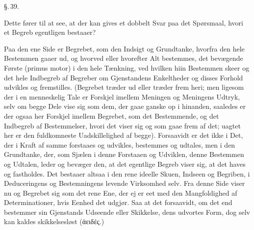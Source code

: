 \documentclass[12pt]{book}
\def\sperr#1{#1}%
\def\textit#1{#1}%
\def\emph#1{#1}%
\newcommand{\sperr}[1]{\textls[180]{#1}}
\newcommand{\parag}[1]{%
  \par\vspace{0.9\baselineskip}%
  {\centering\textit{\S.\,#1.}\par}%
  \vspace{0.35\baselineskip}%
  \noindent\hspace{\parindent}\ignorespaces
}
\newcommand{\opage}[1]{\marginnote{\footnotesize\textit{[#1]}}}
\begin{document}
\parag{39}

Dette fører til at see, at der kan gives et dobbelt Svar paa det Spørsmaal,
\emph{hvori et Begreb egentligen \sperr{bestaaer}?}

Paa den ene Side er Begrebet, som den Indsigt og Grundtanke, hvorfra den hele
Bestemmen gaaer ud, og hvorved eller hvorefter Alt bestemmes, det bevægende
Første (\textit{primus motor}) i den hele Tænkning, ved hvilken hiin Bestemmen
skeer og det hele Indbegreb af Begreber om Gjenstandens Enkeltheder og disses
Forhold udvikles og fremstilles. (Begrebet træder ud eller træder frem heri; men
ligesom der i en menneskelig Tale er Forskjel imellem Meningen og Meningens
Udtryk, selv om begge Dele vise sig som dem, der gaae ganske op i hinanden,
saaledes er der ogsaa her Forskjel imellem Begrebet, som det Bestemmende, og det
Indbegreb af Bestemmelser, hvori det viser sig og som gaae frem af det; uagtet
her er den fuldkomneste Uadskillelighed af begge). Forsaavidt er det ikke i Det,
der i Kraft af samme forstaaes og udvikles, bestemmes og udtales, men i den
Grundtanke, der, som Sjælen i denne Forstaaen og Udviklen, denne Bestemmen og
Udtalen, leder og bevæger den, at det egentlige Begreb viser sig, at det haves og
fastholdes. Det bestaaer altsaa i den rene ideelle Skuen, Indseen og Begriben, i
Deduceringens og Bestemningens
\opage{102} levende Virksomhed selv. Fra denne Side viser nu og Begrebet sig som det
\emph{rene Ene}, der ej er eet med den Mangfoldighed af Determinationer, hvis
Eenhed det udgjør. Saa at det forsaavidt, om det end bestemmer sin Gjenstands
Udseende eller Skikkelse, dens udvortes Form, dog selv kan kaldes skikkelsesløst
(\textit{ἀειδές.})
\end{document}
